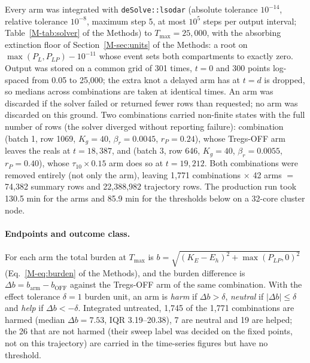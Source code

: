 \documentclass[11pt]{article}
\begin{document}
Every arm was integrated with \texttt{deSolve::lsodar} (absolute tolerance
$10^{-14}$, relative tolerance $10^{-8}$, maximum step 5, at most $10^5$ steps per
output interval; Table~\ref{M-tab:solver} of the Methods) to $T_{\max}=25{,}000$, with the absorbing extinction floor of
Section~\ref{M-sec:units} of the Methods: a root on $\max(P_L,P_{LP})-10^{-11}$ whose event sets
both compartments to exactly zero. Output was stored on a common grid of 301
times, $t=0$ and 300 points log-spaced from 0.05 to 25,000; the extra knot a
delayed arm has at $t=d$ is dropped, so medians across combinations are taken at
identical times. An arm was discarded if the solver failed or returned fewer
rows than requested; no arm was discarded on this ground. Two combinations
carried non-finite states with the full number of rows (the solver diverged
without reporting failure): combination (batch 1, row 1069, $K_g=40$,
$\beta_r=0.0045$, $r_P=0.24$), whose Tregs-OFF arm leaves the
reals at $t=18{,}387$, and (batch 3, row 646, $K_g=40$, $\beta_r=0.0055$,
$r_P=0.40$), whose $\tau_{10}\times0.15$ arm does so at $t=19{,}212$. Both
combinations were removed entirely (not only the arm), leaving 1,771 combinations
$\times$ 42 arms $=$ 74,382 summary rows and 22,388,982 trajectory rows. The
production run took 130.5 min for the arms and 85.9 min for the thresholds below
on a 32-core cluster node.

\paragraph{Endpoints and outcome class.}
For each arm the total burden at $T_{\max}$ is
$b=\sqrt{(K_E-E_h)^2+\max(P_{LP},0)^2}$ (Eq.~\ref{M-eq:burden} of the Methods), and the
burden difference is $\Delta b = b_{\mathrm{arm}} - b_{\mathrm{OFF}}$ against the
Tregs-OFF arm of the same combination. With the effect tolerance
$\delta=1$ burden unit, an arm is \emph{harm} if $\Delta b>\delta$,
\emph{neutral} if $|\Delta b|\le\delta$ and \emph{help} if $\Delta b<-\delta$.
Integrated untreated, 1,745 of the 1,771 combinations are harmed (median
$\Delta b=7.53$, IQR 3.19--20.38), 7 are neutral and 19 are helped; the 26 that
are not harmed (their sweep label was decided on the fixed points, not on this
trajectory) are carried in the time-series figures but have no threshold.
\end{document}
